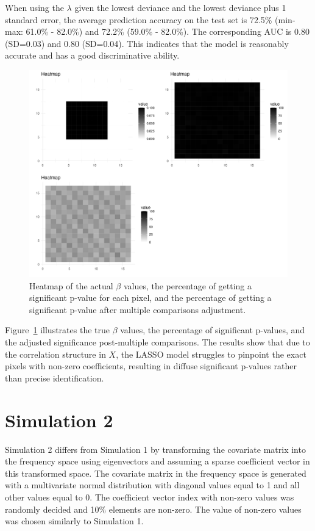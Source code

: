 \documentclass[12pt]{article}
\begin{document}
When using the \(\lambda\) given the lowest deviance and the lowest deviance plus 1 standard error, the average prediction accuracy on the test set is 72.5\% (min-max: 61.0\% - 82.0\%) and 72.2\% (59.0\% - 82.0\%). The corresponding AUC is 0.80 (SD=0.03) and 0.80 (SD=0.04). This indicates that the model is reasonably accurate and has a good discriminative ability.

\begin{figure}[H]
  \centering
  \includegraphics[width=\textwidth]{../Figures/sim1_heatmap.png}
  \caption{Heatmap of the actual \(\beta\) values, the percentage of getting a significant p-value for each pixel, and the percentage of getting a significant p-value after multiple comparisons adjustment.}
  \label{fig:sim1_heatmap}
\end{figure}

Figure~\ref{fig:sim1_heatmap} illustrates the true \(\beta\) values, the percentage of significant p-values, and the adjusted significance post-multiple comparisons. The results show that due to the correlation structure in \( X \), the LASSO model struggles to pinpoint the exact pixels with non-zero coefficients, resulting in diffuse significant p-values rather than precise identification.

\section*{Simulation 2}

Simulation 2 differs from Simulation 1 by transforming the covariate matrix into the frequency space using eigenvectors and assuming a sparse coefficient vector in this transformed space. The covariate matrix in the frequency space is generated with a multivariate normal distribution with diagonal values equal to 1 and all other values equal to 0. The coefficient vector index with non-zero values was randomly decided and 10\% elements are non-zero. The value of non-zero values was chosen similarly to Simulation 1.
\end{document}
